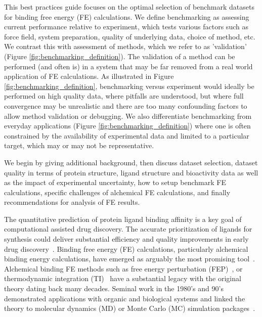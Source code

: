 \documentclass[9pt,bestpractices]{livecoms}
\begin{document}
This best practices guide focuses on the optimal selection of benchmark datasets for binding free energy (FE) calculations. We define benchmarking as assessing current performance relative to experiment, which tests various factors such as force field, system preparation, quality of underlying data, choice of method, etc. We contrast this with assessment of methods, which we refer to as 'validation' (Figure \ref{fig:benchmarking_definition}). The validation of a method can be performed (and often is) in a system that may be far removed from a real world application of FE calculations.\cite{mobleyPredictingBindingFree2017} As illustrated in Figure \ref{fig:benchmarking_definition}, benchmarking versus experiment would ideally be performed on high quality data, where pitfalls are understood, but where full convergence may be unrealistic and there are too many confounding factors to allow method validation or debugging. We also differentiate benchmarking from everyday applications (Figure \ref{fig:benchmarking_definition}) where one is often constrained by the availability of experimental data and limited to a particular target, which may or may not be representative. 

We begin by giving additional background, then discuss dataset selection, dataset quality in terms of protein structure, ligand structure and bioactivity data as well as the impact of experimental uncertainty, how to setup benchmark FE calculations, specific challenges of alchemical FE calculations, and finally recommendations for analysis of FE results.

The quantitative prediction of protein ligand binding affinity is a key goal of computational assisted drug discovery. The accurate prioritization of ligands for synthesis could deliver substantial efficiency and quality improvements in early drug discovery~\cite{abelCriticalReviewValidation2017,abelModelingValuePredictive2018}. Binding free energy (FE) calculations, particularly alchemical binding energy calculations, have emerged as arguably the most promising tool~\cite{courniaRelativeBindingFree2017}. Alchemical binding FE methods such as free energy perturbation (FEP)~\cite{zwanzigHighTemperatureEquation1954,bennettEfficientEstimationFree1976}, or thermodynamic integration (TI)~\cite{kirkwoodQuantumStatisticsAlmost1933,kirkwoodQuantumStatisticsAlmost1934,kirkwoodStatisticalMechanicsFluid1935} have a substantial legacy with the original theory dating back many decades. Seminal work in the 1980’s and 90’s demonstrated applications with organic and biological systems and linked the theory to molecular dynamics (MD) or Monte Carlo (MC) simulation packages~\cite{jorgensenMonteCarloSimulation1985,straatsmaFreeEnergyHydrophobic1986,lybrandTheoreticalCalculationRelative1986,merzFreeEnergyPerturbation1989,pearlmanDeterminationDifferentialEffects1995,choderaAlchemicalFreeEnergy2011,mobleyPerspectiveAlchemicalFree2012}. 
\end{document}
